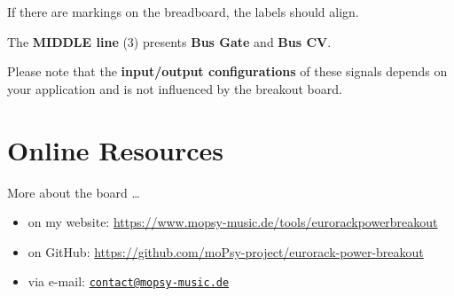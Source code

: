 \documentclass[a4paper,
               11pt,
               parskip=half,
               headinclude,
               titlepage=false]{scrartcl}
\begin{document}
If there are markings on the breadboard, the labels should align.


\vspace{2em}

The \textbf{MIDDLE line} (3) presents \textbf{\color{red}Bus Gate} and \textbf{\color{red}Bus CV}.

Please note that the \textbf{input/output configurations} of these signals depends on your application and is not influenced by the breakout board.


\section*{Online Resources}

More about the board  …
\begin{itemize}[noitemsep]
 \item on my website: \url{https://www.mopsy-music.de/tools/eurorackpowerbreakout}
 \item on GitHub: \url{https://github.com/moPsy-project/eurorack-power-breakout}
 \item via e-mail: \href{mailto:contact@mopsy-music.de}{\texttt{contact@mopsy-music.de}}
\end{itemize}
\end{document}
